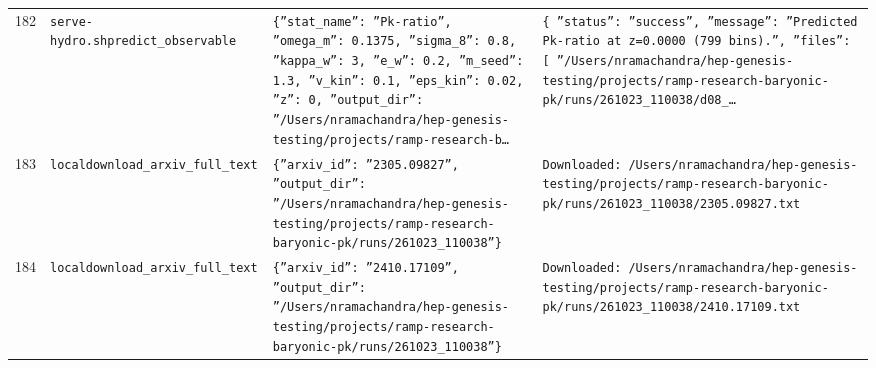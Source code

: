 \documentclass[11pt,a4paper]{article}
\begin{document}
\begin{longtable}{@{}p{}p{}p{}p{}@{}}
182 & \texttt{serve-hydro.sh}\newline\texttt{predict\_\allowbreak{}observable} & \texttt{\{''stat\_\allowbreak{}name'':\allowbreak{} ''Pk-ratio'',\allowbreak{} ''omega\_\allowbreak{}m'':\allowbreak{} 0.1375,\allowbreak{} ''sigma\_\allowbreak{}8'':\allowbreak{} 0.8,\allowbreak{} ''kappa\_\allowbreak{}w'':\allowbreak{} 3,\allowbreak{} ''e\_\allowbreak{}w'':\allowbreak{} 0.2,\allowbreak{} ''m\_\allowbreak{}seed'':\allowbreak{} 1.3,\allowbreak{} ''v\_\allowbreak{}kin'':\allowbreak{} 0.1,\allowbreak{} ''eps\_\allowbreak{}kin'':\allowbreak{} 0.02,\allowbreak{} ''z'':\allowbreak{} 0,\allowbreak{} ''output\_\allowbreak{}dir'':\allowbreak{} ''/\allowbreak{}Users/\allowbreak{}nramachandra/\allowbreak{}hep-genesis-testing/\allowbreak{}projects/\allowbreak{}ramp-research-b\ldots{}\allowbreak{}} & \texttt{\{   ''status'':\allowbreak{} ''success'',\allowbreak{}   ''message'':\allowbreak{} ''Predicted Pk-ratio at z=\allowbreak{}0.0000 (799 bins)\allowbreak{}.'',\allowbreak{}   ''files'':\allowbreak{} [     ''/\allowbreak{}Users/\allowbreak{}nramachandra/\allowbreak{}hep-genesis-testing/\allowbreak{}projects/\allowbreak{}ramp-research-baryonic-pk/\allowbreak{}runs/\allowbreak{}261023\_\allowbreak{}110038/\allowbreak{}d08\_\allowbreak{}\ldots{}\allowbreak{}} \\
183 & \texttt{local}\newline\texttt{download\_\allowbreak{}arxiv\_\allowbreak{}full\_\allowbreak{}text} & \texttt{\{''arxiv\_\allowbreak{}id'':\allowbreak{} ''2305.09827'',\allowbreak{} ''output\_\allowbreak{}dir'':\allowbreak{} ''/\allowbreak{}Users/\allowbreak{}nramachandra/\allowbreak{}hep-genesis-testing/\allowbreak{}projects/\allowbreak{}ramp-research-baryonic-pk/\allowbreak{}runs/\allowbreak{}261023\_\allowbreak{}110038''\}\allowbreak{}} & \texttt{Downloaded:\allowbreak{} /\allowbreak{}Users/\allowbreak{}nramachandra/\allowbreak{}hep-genesis-testing/\allowbreak{}projects/\allowbreak{}ramp-research-baryonic-pk/\allowbreak{}runs/\allowbreak{}261023\_\allowbreak{}110038/\allowbreak{}2305.09827.txt} \\
184 & \texttt{local}\newline\texttt{download\_\allowbreak{}arxiv\_\allowbreak{}full\_\allowbreak{}text} & \texttt{\{''arxiv\_\allowbreak{}id'':\allowbreak{} ''2410.17109'',\allowbreak{} ''output\_\allowbreak{}dir'':\allowbreak{} ''/\allowbreak{}Users/\allowbreak{}nramachandra/\allowbreak{}hep-genesis-testing/\allowbreak{}projects/\allowbreak{}ramp-research-baryonic-pk/\allowbreak{}runs/\allowbreak{}261023\_\allowbreak{}110038''\}\allowbreak{}} & \texttt{Downloaded:\allowbreak{} /\allowbreak{}Users/\allowbreak{}nramachandra/\allowbreak{}hep-genesis-testing/\allowbreak{}projects/\allowbreak{}ramp-research-baryonic-pk/\allowbreak{}runs/\allowbreak{}261023\_\allowbreak{}110038/\allowbreak{}2410.17109.txt} \\

\end{longtable}
\end{document}
